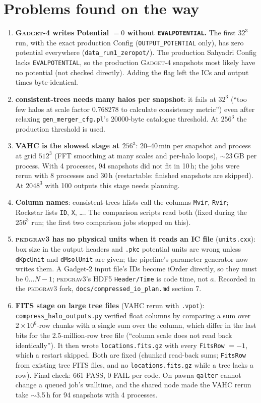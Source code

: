 \documentclass[11pt,a4paper]{article}
\newcommand{\pkd}{\textsc{pkdgrav3}}
\newcommand{\gad}{\textsc{Gadget-4}}
\newcommand{\fp}[1]{\nolinkurl{#1}}
\begin{document}
\section{Problems found on the way}
\label{sec:issues}
\begin{enumerate}
\item \textbf{\gad{} writes Potential $=0$ without \texttt{EVALPOTENTIAL}.} The first $32^3$ run, with the exact
production Config (\texttt{OUTPUT\_POTENTIAL} only), has zero potential everywhere
(\fp{data_run1_zeropot/}). The production Sahyadri Config lacks \texttt{EVALPOTENTIAL}, so the production
\gad{} snapshots most likely have no potential (not checked directly). Adding the flag left the ICs and output
times byte-identical.
\item \textbf{consistent-trees needs many halos per snapshot}: it fails at $32^3$ (``too few halos at scale factor
0.768278 to calculate consistency metric'') even after relaxing \fp{gen_merger_cfg.pl}'s 20000-byte catalogue
threshold. At $256^3$ the production threshold is used.
\item \textbf{VAHC is the slowest stage at $256^3$}: 20--40\,min per snapshot and process at grid $512^3$ (FFT
smoothing at many scales and per-halo loops), $\sim$23\,GB per process. With 4 processes, 94 snapshots did not fit in
10\,h; the jobs were rerun with 8 processes and 30\,h (restartable: finished snapshots are skipped). At $2048^3$
with 100 outputs this stage needs planning.
\item \textbf{Column names}: consistent-trees hlists call the columns \texttt{Mvir}, \texttt{Rvir}; Rockstar lists
\texttt{ID}, \texttt{X}, \ldots. The comparison scripts read both (fixed during the $256^3$ run; the first two
comparison jobs stopped on this).
\item \textbf{\pkd{} has no physical units when it reads an IC file} (\fp{units.cxx}): box size in the output
headers and \texttt{.pkc} potential units are wrong unless \fp{dKpcUnit} and \fp{dMsolUnit} are given; the
pipeline's parameter generator now writes them. A Gadget-2 input file's IDs become iOrder directly, so they must be
$0\ldots N-1$; \pkd{}'s HDF5 \texttt{Header/Time} is code time, not $a$. Recorded in the \pkd{} fork,
\fp{docs/compressed_io_plan.md} section 7.
\item \textbf{FITS stage on large tree files} (VAHC rerun with \texttt{.vpot}): \fp{compress_halo_outputs.py}
verified float columns by comparing a sum over $2\times10^6$-row chunks with a single sum over the column, which
differ in the last bits for the 2.5-million-row tree file (``column scale does not read back identically''). It then
wrote \fp{locations.fits.gz} with every \texttt{FitsRow} $=-1$, which a restart skipped. Both are fixed (chunked
read-back sums; \texttt{FitsRow} from existing tree FITS files, and no \fp{locations.fits.gz} while a tree lacks a row).
Final check: 661 PASS, 0 FAIL per code. On pawna \texttt{qalter} cannot change a queued job's walltime, and the
shared node made the VAHC rerun take $\sim$3.5\,h for 94 snapshots with 4 processes.
\end{enumerate}
\end{document}
